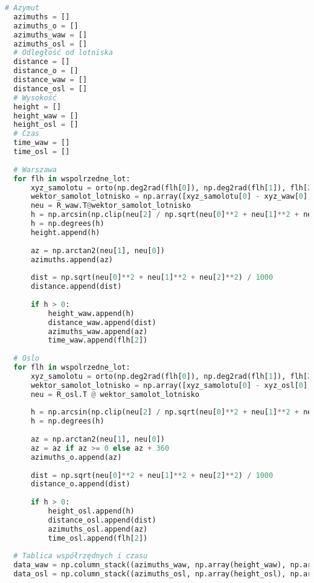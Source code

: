 \documentclass[fleqn,10pt,a4paper]{article}
\begin{document}
\newpage
\begin{lstlisting}[language = Python, caption = Transformacja współrzędnych, label = petla]
  # Azymut
  azimuths = []
  azimuths_o = []
  azimuths_waw = []
  azimuths_osl = []
  # Odległość od lotniska
  distance = []
  distance_o = []
  distance_waw = []
  distance_osl = []
  # Wysokość
  height = []
  height_waw = []
  height_osl = []
  # Czas
  time_waw = []
  time_osl = []
  
  # Warszawa 
  for flh in wspolrzedne_lot:
      xyz_samolotu = orto(np.deg2rad(flh[0]), np.deg2rad(flh[1]), flh[2])
      wektor_samolot_lotnisko = np.array([xyz_samolotu[0] - xyz_waw[0], xyz_samolotu[1] - xyz_waw[1], xyz_samolotu[2] - xyz_waw[2]])
      neu = R_waw.T@wektor_samolot_lotnisko
      h = np.arcsin(np.clip(neu[2] / np.sqrt(neu[0]**2 + neu[1]**2 + neu[2]**2), -1, 1))
      h = np.degrees(h)
      height.append(h)
  
      az = np.arctan2(neu[1], neu[0])
      azimuths.append(az)
  
      dist = np.sqrt(neu[0]**2 + neu[1]**2 + neu[2]**2) / 1000
      distance.append(dist)
  
      if h > 0:
          height_waw.append(h)
          distance_waw.append(dist)
          azimuths_waw.append(az)
          time_waw.append(flh[2])
  
  # Oslo
  for flh in wspolrzedne_lot:
      xyz_samolotu = orto(np.deg2rad(flh[0]), np.deg2rad(flh[1]), flh[2])
      wektor_samolot_lotnisko = np.array([xyz_samolotu[0] - xyz_osl[0], xyz_samolotu[1] - xyz_osl[1], xyz_samolotu[2] - xyz_osl[2]])
      neu = R_osl.T @ wektor_samolot_lotnisko
  
      h = np.arcsin(np.clip(neu[2] / np.sqrt(neu[0]**2 + neu[1]**2 + neu[2]**2), -1, 1))
      h = np.degrees(h)
  
      az = np.arctan2(neu[1], neu[0])
      az = az if az >= 0 else az + 360
      azimuths_o.append(az)
      
      dist = np.sqrt(neu[0]**2 + neu[1]**2 + neu[2]**2) / 1000
      distance_o.append(dist)
  
      if h > 0:
          height_osl.append(h)
          distance_osl.append(dist)
          azimuths_osl.append(az)
          time_osl.append(flh[2])
  
  # Tablica współrzędnych i czasu
  data_waw = np.column_stack((azimuths_waw, np.array(height_waw), np.array(distance_waw), np.array(time_waw)))
  data_osl = np.column_stack((azimuths_osl, np.array(height_osl), np.array(distance_osl), np.array(time_osl)))
  
\end{lstlisting}
\end{document}
